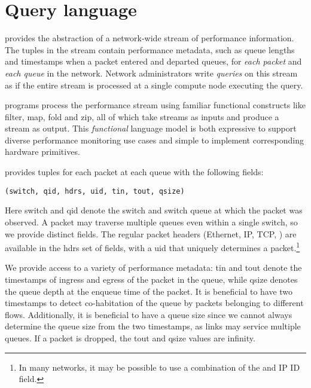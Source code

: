 \section{\THESYSTEM Query language}
\label{sec:language}
\TheSystem provides the abstraction of a network-wide stream of performance
information. The tuples in the stream contain performance metadata, such as
queue lengths and timestamps when a packet entered and departed queues, for {\em
  each packet} and {\em each queue} in the network. Network administrators write
{\em queries} on this stream as if the entire stream is processed at a single
compute node executing the query.

\TheSystem programs process the performance stream using familiar functional
constructs like {\ct filter}, {\ct map}, {\ct fold} and {\ct zip}, all of which
take streams as inputs and produce a stream as output. This {\em functional}
language model is both expressive to support diverse performance monitoring use
cases and simple to implement corresponding hardware primitives.

 \TheSystem provides tuples for each packet at
each queue with the following fields:
\begin{lstlisting}
(switch, qid, hdrs, uid, tin, tout, qsize)
\end{lstlisting}
Here {\ct switch} and {\ct qid} denote the switch and switch queue at which the
packet was observed. A packet may traverse multiple queues even within a single
switch, so we provide distinct fields. The regular packet headers (Ethernet, IP,
TCP, \etc) are available in the {\ct hdrs} set of fields, with a {\ct uid} that
uniquely determines a packet.\footnote{In many networks, it may be possible to
  use a combination of the \txtftuple and IP ID field.}

We provide access to a variety of performance metadata: {\ct tin} and {\ct tout}
denote the timestamps of ingress and egress of the packet in the queue, while
{\ct qsize} denotes the queue depth at the enqueue time of the packet. It is
beneficial to have two timestamps to detect co-habitation of the queue by
packets belonging to different flows. Additionally, it is beneficial to have a
queue size since we cannot always determine the queue size from the two
timestamps, as links may service multiple queues. If a packet
is dropped, the {\ct tout} and {\ct qsize} values are {\ct infinity.}


